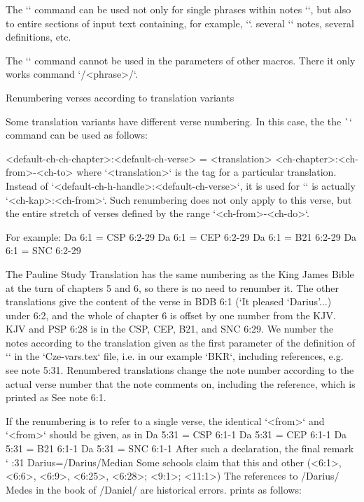 {{{{{The `\switch` command can be used not only for single phrases within notes
`\Note`, but also to entire sections of input text containing, for example, `\Note`.
several `\Note` notes, several definitions, etc.

The `\switch` command cannot be used in the parameters of other macros. There it only works
command `\x/<phrase>/`.


\secc[renum] Renumbering verses according to translation variants

Some translation variants have different verse numbering. In this case, the
the \`\renum` command can be used as follows:

\begtt
{} <default-ch-ch-chapter>:<default-ch-verse> = <translation> <ch-chapter>:<ch-from>-<ch-to>
\endtt
where `<translation>` is the tag for a particular translation.
Instead of `<default-ch-h-handle>:<default-ch-verse>`, it is used for `\def\tmark{<translation>}`
is actually `<ch-kap>:<ch-from>`.
Such renumbering does not only apply to
this verse, but the entire stretch of verses defined by the range `<ch-from>-<ch-do>`.

For example:
\begtt
\renum Da 6:1 = CSP 6:2-29
\renum Da 6:1 = CEP 6:2-29
\renum Da 6:1 = B21 6:2-29
\renum Da 6:1 = SNC 6:2-29
\endtt

The Pauline Study Translation has the same numbering as the King James Bible at the turn of chapters 5 and 6, so there is no need to renumber it.
The other translations give the content of the verse in BDB 6:1 (`It pleased `Darius'...)
under 6:2, and the whole of chapter 6 is offset by one number from the KJV. KJV and PSP 6:28 is in the CSP, CEP, B21, and SNC 6:29.
We number the notes according to the translation given as the first parameter of the definition of `\variants` in the `Cze-vars.tex` file, i.e. in our example `BKR`, including references, e.g. see note 5:31.
Renumbered translations change the note number according to the actual verse number that the note comments on, including the reference, which is printed as See note 6:1.

If the renumbering is to refer to a single verse, the identical `<from>` and `<from>` should be given, as in 
\begtt
\renum Da 5:31 = CSP 6:1-1
\renum Da 5:31 = CEP 6:1-1
\renum Da 5:31 = B21 6:1-1
\renum Da 5:31 = SNC 6:1-1
\endtt
After such a declaration, the final remark 
\begtt \catcode`
:31 {Darius}={\x/Darius/Median} Some schools claim that this and other 
   (<6:1>, <6:6>, <6:9>, <6:25>, <6:28>; <9:1>; <11:1>)     
   The references to \x/Darius/ Medes in the book of \x/Daniel/ are historical errors.
\endtt
prints as follows:

}}}}}
